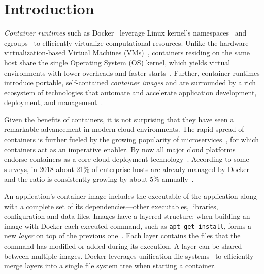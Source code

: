 \section{Introduction}
\label{sec:intro}

%
%
%
%
%
%
%


\emph{Container runtimes} such as Docker~\cite{docker} 
leverage Linux kernel's namespaces~\cite{namespaces} and cgroups~\cite{cgroups}
to efficiently virtualize computational resources.
%
Unlike the hardware-virtualization-based Virtual Machines
(VMs)~\cite{adams2006comparison}, containers residing on the same host share
the single Operating System (OS) kernel, which yields virtual environments with
lower overheads and faster starts~\cite{7819678}.
%
Further, container runtimes introduce portable, self-contained \emph{container
images} and are surrounded by a rich ecosystem of technologies that automate
and accelerate application development, deployment, and
management~\cite{cncfprojects}.

Given the benefits of containers, it is not surprising that they have seen a
remarkable advancement in modern cloud environments.
%
The rapid spread of containers is further fueled by the growing popularity of
microservices~\cite{wolff2016microservices},
for which containers act as an imperative enabler.
%
By now all major cloud platforms endorse containers as a core cloud deployment
technology~\cite{googlecengine,azurec,ibmkube,awscont}.
%
According to some surveys, in 2018 about 21\% of enterprise hosts are already
managed by Docker and the ratio is consistently growing by about 5\%
annually~\cite{20percentdocker}.


An application's container image includes the executable of the application
along with a complete set of its dependencies---other executables, libraries,
configuration and data files.
%
Images have a layered structure; when building an image with Docker each
executed command, such as \texttt{apt-get install}, forms a new \emph{layer} on
top of the previous one~\cite{dockerfile}.
%
Each layer contains the files that the command has modified or added during its
execution.
%
A layer can be shared between multiple images.
%
Docker leverages unification file systems~\cite{docker-driver-eval} to
efficiently merge layers into a single file system tree when starting a container.

